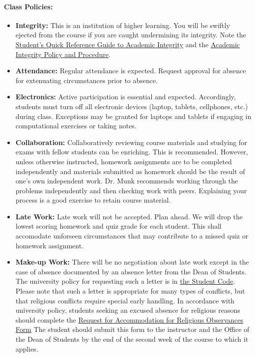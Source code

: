 \documentclass[11pt, a4paper]{article}
\begin{document}
\paragraph{Class Policies:}

\begin{itemize}
\item[] \textbf{Integrity:} This is an institution of higher
learning. You will be swiftly ejected from the course if you are caught
undermining its integrity. Note the
\href{http://www.provost.illinois.edu/academicintegrity/students.html}{Student's
Quick Reference Guide to Academic Integrity} and the
\href{http://studentcode.illinois.edu/article1_part4_1-401.html}{Academic
Integrity Policy and Procedure}.
\item[] \textbf{Attendance:} Regular attendance is expected. Request approval for absence for extenuating circumstances prior to absence.
\item[] \textbf{Electronics:} Active participation is essential and expected.
        Accordingly, students must turn off all electronic devices (laptop,
        tablets, cellphones, etc.) during class. Exceptions may be granted for
        laptops and tablets if engaging in computational exercises or taking notes.
\item[] \textbf{Collaboration:} Collaboratively reviewing course materials and
  studying for exams with fellow students can be enriching.  This is
  recommended.  However, unless otherwise instructed, homework assignments are
  to be completed independently and materials submitted as homework should be
  the result of one's own independent work. Dr. Munk recommends working through
  the problems independently and then checking work with peers. Explaining your
  process is a good exercise to retain course material.
\item[] \textbf{Late Work:} Late work will not be accepted. Plan ahead.
        We will drop the lowest scoring homework and quiz grade for each
        student. This shall accomodate unforseen circumstances that may
        contribute to a missed quiz or homework assignment.

\item[] \textbf{Make-up Work:} There will be no negotiation about late work
        except in the case of absence documented by an absence letter from the
        Dean of Students.  The university policy for requesting such a letter
        is in
        \href{http://studentcode.illinois.edu/article1_part5_1-501.html}{the
        Student Code}. Please note that such a letter is appropriate for many
        types of conflicts, but that religious conflicts require special early
        handling. In accordance with university policy, students seeking an
        excused absence for religious reasons should complete the
	\href{http://odos.illinois.edu/community-of-care/resources/students/religious-observances/}{Request for Accommodation for Religious Observances Form}
        The student should submit this
        form to the instructor and the Office of the Dean of Students by the end of the
        second week of the course to which it applies.



\end{itemize}
\end{document}
